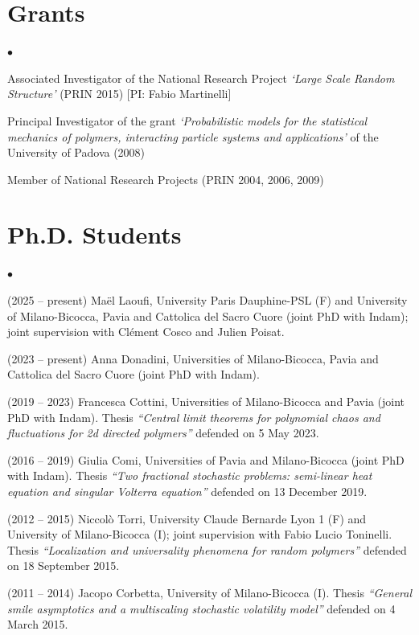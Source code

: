 \documentclass[a4paper,11pt,oneside]{amsart}
\newenvironment{myitemize}{%
\begin{list}{$\bullet$}%
 	{%
	\setlength{\itemsep}{0.3em}%
	\setlength{\topsep}{0.3em}%
	\setlength{\partopsep}{0em}%
	\setlength{\parsep}{0em}%
	\setlength{\parskip}{0em}%
	\setlength\leftmargin{1.5em}%
	\setlength\labelwidth{1.1em}%
	\setlength{\labelsep}{0.4em}%
	}%
	}%
{\end{list}}
\renewenvironment{itemize}{
\begin{myitemize}}%
{\end{myitemize}}
\begin{document}
 




\section{Grants}

\begin{itemize}
\item Associated Investigator 
of the National Research Project
\emph{`Large Scale Random Structure'} (PRIN 2015) [PI: Fabio Martinelli]

\item Principal Investigator of the grant
\emph{`Probabilistic models for the statistical mechanics of polymers, 
interacting particle systems and applications'}
of the University of Padova (2008)

\item Member of National Research Projects (PRIN 2004, 2006, 2009) 
\end{itemize}


\section{Ph.D. Students}

\begin{itemize}
\item (2025 -- present) Maël Laoufi,
University Paris Dauphine-PSL (F) and University of Milano-Bicocca, Pavia and Cattolica del Sacro Cuore
(joint PhD with Indam); joint supervision with Clément Cosco and Julien Poisat.

\item (2023 -- present) Anna Donadini,
Universities of Milano-Bicocca, Pavia and Cattolica del Sacro Cuore
(joint PhD with Indam).

\item (2019 -- 2023) Francesca Cottini,
Universities of Milano-Bicocca and Pavia
(joint PhD with Indam).
Thesis \emph{``Central limit theorems for polynomial chaos and fluctuations for 2d directed polymers''}
defended on 5 May 2023.


\item (2016 -- 2019) Giulia Comi,
Universities of Pavia and Milano-Bicocca
(joint PhD with Indam).
Thesis \emph{``Two fractional stochastic problems: semi-linear heat equation 
and singular Volterra equation''} defended on 13 December 2019.

\item (2012 -- 2015) Niccol\`o Torri,
University Claude Bernarde Lyon 1 (F) and University of Milano-Bicocca (I);
joint supervision with Fabio Lucio Toninelli.
Thesis \emph{``Localization and universality phenomena for
random polymers''} defended on 18 September 2015.


\item (2011 -- 2014) Jacopo Corbetta, University of Milano-Bicocca (I).
Thesis \emph{``General smile asymptotics and a multiscaling
stochastic volatility model''} defended on 4 March 2015.
\end{itemize}
\end{document}
